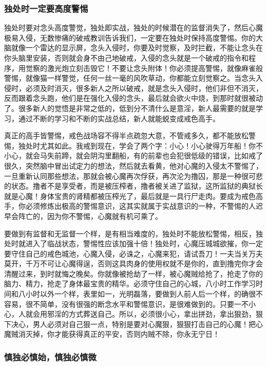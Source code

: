\subsubsection{独处时一定要高度警惕}

独处时要对念头高度警觉，独处即实战，独处的时候潜在的监督消失了，然后心魔极易入侵，无数惨痛的破戒教训告诉我们，一定要在独处时保持高度警惕。你的大脑就像一个雷达的显示屏，念头入侵时，你要及时觉察，及时拦截，不能让念头在你头脑里安装，否则就会身不由己地破戒，入侵的念头就是一个破戒的指令和程序，用觉察的激光炮立刻击毁它！不要让念头附体！你必须提高警惕，就像麻雀般警惕，就像猫一样警觉，任何一丝一毫的风吹草动，你都能立刻觉察之。当念头入侵时，必须及时消灭，很多新人之所以破戒，就是念头入侵时，他们非但不消灭，反而跟着念头跑，他们是在强化入侵的念头，最后就会欲火中烧，到那时就很被动了。很多新人的觉悟是非常之低的，低到分不清什么是意淫，新人最需要的就是学习，通过不断的学习和不断的实战总结，新人就能蜕变成戒色高手。

真正的高手皆警惕，戒色战场容不得半点疏忽大意，不管戒多久，都不能放松警惕，独处时尤其如此。我戒到现在，学会了两个字：小心！小心驶得万年船！你不小心，就会马失前蹄，就会阴沟里翻船，有的前辈也会犯很低级的错误，比如戒了很久，突然脑中冒出试定力的想法，然后就去看黄，他对心魔的入侵太不警惕了，一旦重新认同那些想法，那就会被心魔再次俘获，再次沦为撸囚，那是一种很可悲的状态。撸者不是享受者，而是被压榨者，撸者被关进了监狱，这所监狱的典狱长就是心魔！身体宝贵的肾精都被压榨光了，最后就是一具行尸走肉。要成为戒色高手，你必须修炼出极高的警惕意识，这其实就属于实战意识的一种，不警惕的人迟早会阵亡的，因为你不警惕，心魔就有机可乘了。

要做到有监督和无监督一个样，是有相当难度的，独处时不能放松警惕，相反，独处时就进入了临战状态，警惕性应该加强十倍！独处时，心魔压城城欲摧，你一定要守住自己的戒色城池，心魔入侵，必诛之，心魔来犯，请试吾刀！一夫当关万夫莫开，千万不可让心魔得逞，否则这具肉身的使用权就不是你的，直到撸完你才会清醒过来，到时就悔之晚矣。你就像被抢劫了一样，被心魔贼给抢了，抢走了你的脑力、精力，抢走了身体最宝贵的精华。必须守住自己的心城，八小时工作学习时间和八小时以外一个样，表里如一，光明磊落，要做到人前人后一个样，的确很不容易，很不简单，没有很强的断念水平和警惕意识，是很难做到的。只要一不小心，人就会用邪淫的方式葬送自己。所以，必须很小心，拿出拼劲，拿出狠劲，狠下决心，男人必须对自己狠一点，特别是要对心魔狠，狠狠打击自己的心魔！把心魔贼消灭掉，你才能获得真正的平安，否则内贼不除，你永无宁日！

\subsubsection{慎独必慎始，慎独必慎微}

